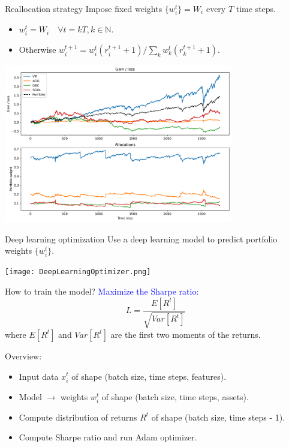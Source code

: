 \documentclass[pdf]{beamer}
\begin{document}
	\begin{frame}{Reallocation strategy}
		Impose fixed weights $\{ w_i^t \} = W_i$ every $T$ time steps.
		\begin{itemize}
			\item $w_i^t = W_i \quad \forall t = kT, k \in \mathbb{N}$.
			\item Otherwise $w_i^{t+1} = w_i^t (r_i^{t+1} + 1) / \sum_k w_k^t (r_k^{t+1} + 1)$.
		\end{itemize}

		\centering
		\includegraphics[width=0.75\textwidth]{reallocation_strategy.png}
	\end{frame}

	\begin{frame}{Deep learning optimization}
		Use a deep learning model to predict portfolio weights $\{ w_i^t \}$.
		
		\vfill
		\centering
		\texttt{[image: DeepLearningOptimizer.png]}
	\end{frame}

	\begin{frame}{How to train the model?}
		\textcolor{blue}{Maximize the Sharpe ratio:}
		$$ L = \frac{E [ R^t ]}{\sqrt{Var [ R^t ]}} $$
		where $E[ R^t ]$ and $Var [ R^t ]$ are the first two moments of the returns.

		Overview:
		\begin{itemize}
			\item Input data $x_i^t$ of shape (batch size, time steps, features).
			\item Model $\to$ weights $w_i^t$ of shape (batch size, time steps, assets).
			\item Compute distribution of returns $R^t$ of shape (batch size, time steps - 1).
			\item Compute Sharpe ratio and run Adam optimizer.
		\end{itemize}

	\end{frame}
\end{document}
